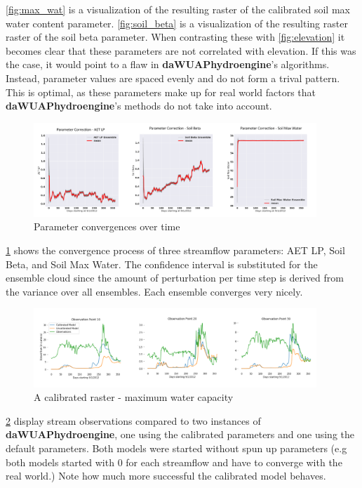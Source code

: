 \ref{fig:max_wat} is a visualization of the resulting raster of the calibrated soil max water content parameter. \ref{fig:soil_beta} is a visualization of the resulting raster raster of the soil beta parameter. When contrasting these with \ref{fig:elevation} it becomes clear that these parameters are not correlated with elevation. If this was the case, it would point to a flaw in \textbf{daWUAPhydroengine}'s algorithms. Instead, parameter values are spaced evenly and do not form a trival pattern. This is optimal, as these parameters make up for real world factors that \textbf{daWUAPhydroengine}'s methods do not take into account.

\begin{figure}[h]
    \centering
    \includegraphics[width=0.95\textwidth]{param}
    \caption{Parameter convergences over time}
    \label{fig:param}
\end{figure} 

\ref{fig:param} shows the convergence process of three streamflow parameters: AET LP, Soil Beta, and Soil Max Water. The confidence interval is substituted for the ensemble cloud since the amount of perturbation per time step is derived from the variance over all ensembles. Each ensemble converges very nicely.

\begin{figure}[h]
    \centering
    \includegraphics[width=0.95\textwidth]{cali}
    \caption{A calibrated raster - maximum water capacity}
    \label{fig:cali}
\end{figure} 

\ref{fig:cali} display stream observations compared to two instances of \textbf{daWUAPhydroengine}, one using the calibrated parameters and one using the default parameters. Both models were started without spun up parameters (e.g both models started with 0 for each streamflow and have to converge with the real world.) Note how much more successful the calibrated model behaves.
